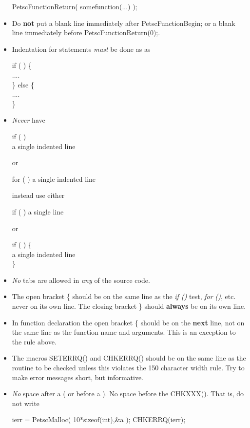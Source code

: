 \documentclass[twoside,12pt]{../sty/report_petsc}
\begin{document}
\begin{itemize}
\begin{tabbing}
   PetscFunctionReturn( somefunction(...) );
\end{tabbing}
\item Do {\bf not} put a blank line immediately after PetscFunctionBegin; or 
a blank line immediately before PetscFunctionReturn(0);.
\item Indentation for  statements {\em must}  be done  as
as
\begin{tabbing}
   if (  ) \{\\
     ....\\
   \} else \{\\
     ....\\
   \}
\end{tabbing}
\item {\em Never}  have 
\begin{tabbing}
   if (  ) \\
     a single indented line
\end{tabbing}
or
\begin{tabbing}
   for (  )
     a single indented line
\end{tabbing}
instead use either 
\begin{tabbing}
   if (  ) a single line
\end{tabbing}
or 
\begin{tabbing}
   if (  ) \{\\
     a single indented line\\
   \}
\end{tabbing}
\item {\em No} tabs are allowed in {\em any} of the source code.
\item The open bracket \{ should be on the same line as the {\em if ()} test, {\em for ()}, etc. never on 
      its own line. The closing bracket \} should {\bf always} be on its own line. 
\item In function declaration the open bracket \{ should be on the {\bf next} line, not on the same line as the function name and
      arguments. This is an exception to the rule above.
\item The macros SETERRQ() and CHKERRQ() should be on the 
      same line as the routine to be checked unless this violates the 
      150 character width rule. Try to make error messages short, but 
      informative.
\item {\em No} space after a ( or before a ). No space before the CHKXXX(). That is, do not write
\begin{tabbing}
   ierr = PetscMalloc( 10*sizeof(int),\&a ); CHKERRQ(ierr);

\end{tabbing}
\end{itemize}
\end{document}
